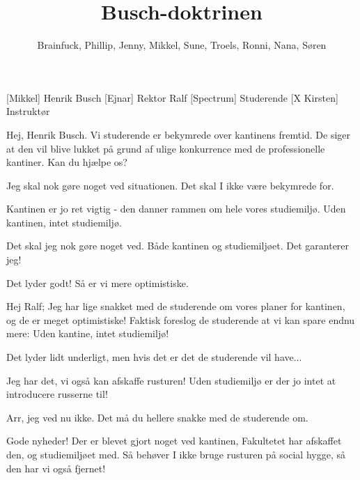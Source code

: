 \documentclass[a4paper,11pt]{article}
\title{Busch-doktrinen}
\author{Brainfuck, Phillip, Jenny, Mikkel, Sune, Troels, Ronni, Nana, Søren}
\begin{document}
  \maketitle

  \begin{roles}
    [Mikkel] Henrik Busch
    [Ejnar] Rektor Ralf
    [Spectrum] Studerende
    [X Kirsten] Instruktør
  \end{roles}

  \begin{props}
  \end{props}

  \begin{sketch}
    
     Hej, Henrik Busch. 
    Vi studerende er bekymrede over kantinens
    fremtid. De siger at den vil blive lukket på grund af ulige
    konkurrence med de professionelle kantiner. Kan du hjælpe os?

     Jeg skal nok gøre noget ved situationen.  Det skal I ikke
    være bekymrede for.

     Kantinen er jo ret vigtig - den danner rammen om hele
    vores studiemiljø. Uden kantinen, intet studiemiljø.

     Det skal jeg nok gøre noget ved. Både kantinen og
    studiemiljøet. Det garanterer jeg!

     Det lyder godt!  Så er vi mere optimistiske.


     Hej Ralf; Jeg har lige snakket med de studerende om vores planer for kantinen, og de er meget optimistiske!  Faktisk
    foreslog de studerende at vi kan spare endnu mere: Uden kantine,
    intet studiemiljø!

     Det lyder lidt underligt, men hvis det er det de studerende 
    vil have...

     Jeg har det, vi også kan afskaffe rusturen! Uden
    studiemiljø er der jo intet at introducere russerne til!

     Arr, jeg ved nu ikke. Det må du hellere snakke med de
    studerende om.


     Gode nyheder! Der er blevet gjort noget ved kantinen,
    Fakultetet har afskaffet den, og studiemiljøet med. 
    Så behøver I ikke bruge rusturen på social hygge, så den har vi også fjernet!


\end{sketch}
\end{document}
